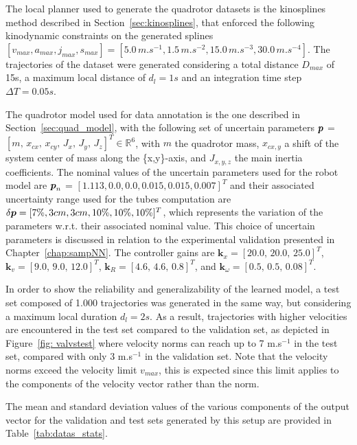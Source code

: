 The local planner used to generate the quadrotor datasets is the kinosplines method described in Section~\ref{sec:kinosplines}, that enforced the following kinodynamic constraints on the generated splines $[v_{max}, a_{max}, j_{max}, s_{max}] = [5.0 \, m.s^{-1}, \allowbreak 1.5 \, m.s^{-2}, \allowbreak 15.0 \, m.s^{-3}, \allowbreak 30.0 \, m.s^{-4}]$. 
The trajectories of the dataset were generated considering a total distance $D_{max}$ of 15s, a maximum local distance of $d_l = 1s$ and an integration time step $\Delta T = 0.05s$. 

The quadrotor model used for data annotation is the one described in Section~\ref{sec:quad_model}, with the following set of uncertain parameters $\boldsymbol{p}$ = $[m, \, \allowbreak x_{cx}, \, \allowbreak x_{cy}, \, \allowbreak J_{x}, \, \allowbreak J_{y}, \,\allowbreak J_{z}]^T \in \mathbb{R}^{6}$, with $m$ the quadrotor mass, $x_{cx,y}$ a shift of the system center of mass along the \{x,y\}-axis, and $J_{x,y,z}$ the main inertia coefficients.
The nominal values of the uncertain parameters used for the robot model are $\boldsymbol{p}_{n}$ = $[1.113, \allowbreak0.0, \allowbreak0.0, \allowbreak0.015, \allowbreak0.015, \allowbreak0.007]^T$ and their associated uncertainty range used for the tubes computation are $\delta\boldsymbol{p} = [7\%, \allowbreak3cm, \allowbreak3cm, \allowbreak10\%, \allowbreak10\%, \allowbreak10\%]^T$, which represents the variation of the parameters w.r.t. their associated nominal value.
This choice of uncertain parameters is discussed in relation to the experimental validation presented in Chapter~\ref{chap:sampNN}.
The controller gains are $\boldsymbol{k}_{x} = [20.0, \, 20.0, \, 25.0]^T$, $\boldsymbol{k}_{v}= [9.0, \, 9.0, \, 12.0]^T$, $\boldsymbol{k}_{R}=[4.6, \, 4.6, \, 0.8]^T$, and $\boldsymbol{k}_{\omega}=[0.5, \, 0.5, \, 0.08]^T$.

In order to show the reliability and generalizability of the learned model, a test set composed of 1.000 trajectories was generated in the same way, but considering a maximum local duration $d_l = 2s$.
As a result, trajectories with higher velocities are encountered in the test set compared to the validation set, as depicted in Figure~\ref{fig: valvstest} where velocity norms can reach up to 7 m.s$^{-1}$ in the test set, compared with only 3 m.s$^{-1}$ in the validation set.
Note that the velocity norms exceed the velocity limit $v_{max}$, this is expected since this limit applies to the components of the velocity vector rather than the norm.

The mean and standard deviation values of the various components of the output vector for the validation and test sets generated by this setup are provided in Table~\ref{tab:datas_stats}.

